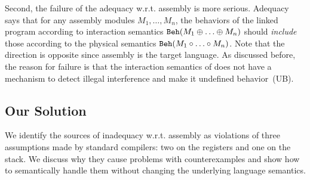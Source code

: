 Second, the failure of the adequacy w.r.t. assembly is more serious.
Adequacy says that for any assembly modules $M_1,\ldots,M_n$,
the behaviors of the linked program according to interaction
semantics $\mathtt{Beh}({M_1 \oplus \ldots \oplus M_n})$ should \emph{include}
those according to the physical semantics $\mathtt{Beh}({M_1 \circ \ldots\circ M_n})$.
Note that the direction is opposite since assembly is the target language.
As discussed before, the reason for failure is that
the interaction semantics of \ccc{} does not have a mechanism to detect
illegal interference and make it undefined behavior~(UB).




\subsection{Our Solution}
\label{sec:overview-semantics:solution}

We identify the sources of inadequacy w.r.t. assembly as violations of
three assumptions made by standard compilers: two on the registers and one on the stack.
We discuss why they 
cause problems with counterexamples and show how to semantically
handle them without changing the underlying language semantics.

  
